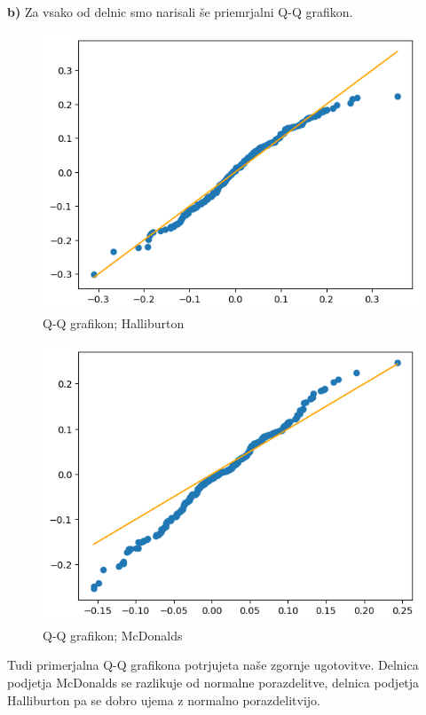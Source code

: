 \documentclass[a4paper,11pt]{article}
\begin{document}
\noindent
\textbf{b)} Za vsako od delnic smo narisali še priemrjalni Q-Q grafikon.

\begin{figure}[H]
    \centering
    \includegraphics[scale = 0.45]{slike1/2_5.png}
    \caption{Q-Q grafikon; Halliburton}
\end{figure}

\begin{figure}[H]
    \centering
    \includegraphics[scale = 0.45]{slike1/2_6.png}
    \caption{Q-Q grafikon; McDonalds}
\end{figure}

\noindent Tudi primerjalna Q-Q grafikona potrjujeta naše zgornje ugotovitve. Delnica podjetja McDonalds se razlikuje od normalne porazdelitve, delnica podjetja Halliburton pa se dobro ujema z normalno porazdelitvijo.
\end{document}
